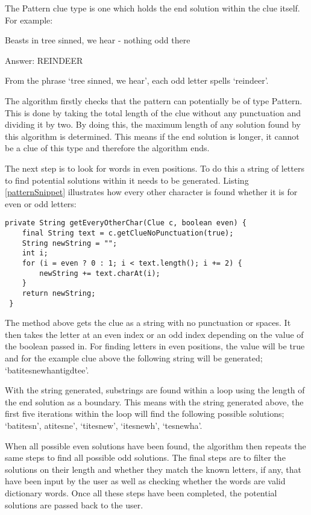 The Pattern clue type is one which holds the end solution within the clue 
itself. For example: 

Beasts in tree sinned, we hear - nothing odd there

Answer: REINDEER

From the phrase `tree sinned, we hear', each odd letter spells `reindeer'. 

The algorithm firstly checks that the pattern can potentially be of type 
Pattern. This is done by taking the total length of the clue without any 
punctuation and dividing it by two. By doing this, the maximum length 
of any solution found by this algorithm is determined. This means  if the
 end solution is longer, it cannot be a clue of this type and therefore the
 algorithm ends. 

The next step is to look for words in even positions. To do this a string of
 letters to find potential solutions within it needs to be generated. 
 Listing \ref{patternSnippet} illustrates how every other character is found 
whether it is for even or odd letters:

\begin{lstlisting}[caption={Retrieving every other character from a string},
                   label=patternSnippet] 
 private String getEveryOtherChar(Clue c, boolean even) {
	final String text = c.getClueNoPunctuation(true);
	String newString = "";
	int i;
	for (i = even ? 0 : 1; i < text.length(); i += 2) {
		newString += text.charAt(i);
	}
	return newString;
 }
\end{lstlisting}

The method above gets the clue as a string with no punctuation or spaces.
It then takes the letter at an even index or an odd index depending on 
the value of the boolean passed in. For finding letters in even positions, 
the value will be true and for the example clue above the following string 
will be generated; `batitesnewhantigdtee'. 

With the string generated, substrings are found within a loop using 
the length of the end solution as a boundary. This means with the 
string generated above, the first five iterations within the loop will 
find the following possible solutions; `batitesn', atitesne', `titesnew', 
`itesnewh', `tesnewha'. 

When all possible even solutions have been found, the algorithm then 
repeats the same steps to find all possible odd solutions. The final steps 
are to filter the solutions on their length and whether they match the known 
letters, if any, that have been input by the user as well as checking 
whether the words are valid dictionary words. Once all these steps 
have been completed, the potential solutions are passed back to the user. 

